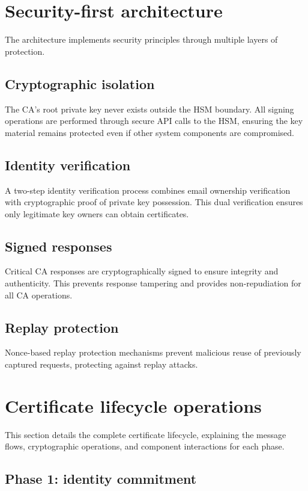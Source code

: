 \section{Security-first architecture}
The architecture implements security principles through multiple 
layers of protection.

\subsection{Cryptographic isolation}
The CA's root private key never exists outside 
the HSM boundary. All signing operations are performed through secure API calls 
to the HSM, ensuring the key material remains protected even if other system 
components are compromised.

\subsection{Identity verification}
A two-step identity verification process combines 
email ownership verification with cryptographic proof of private key possession. 
This dual verification ensures only legitimate key owners can obtain certificates.

\subsection{Signed responses}
Critical CA responses are cryptographically signed to ensure 
integrity and authenticity. This prevents response tampering and provides 
non-repudiation for all CA operations.

\subsection{Replay protection}
Nonce-based replay protection mechanisms prevent 
malicious reuse of previously captured requests, protecting against replay attacks.

\section{Certificate lifecycle operations}

This section details the complete certificate lifecycle, explaining the message 
flows, cryptographic operations, and component interactions for each phase.

\subsection{Phase 1: identity commitment}

